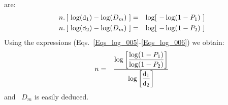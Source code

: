 are:\vspace{-0.1in}
\begin{eqnarray}
  \displaystyle n . \left[~ \log(\mbox{\small d}_1)-\log(D_m)~\right] &=& \log[~-\log(1-P_1)~] \label{Eqs_log_005} \\
  \displaystyle n . \left[~ \log(\mbox{\small d}_2)-\log(D_m)~\right] &=& \log[~-\log(1-P_2)~] \label{Eqs_log_006}
\end{eqnarray}\vspace{-0.1in}
Using the expressions (Eqs.~\ref{Eqs_log_005}-\ref{Eqs_log_006}) we obtain:\vspace{-0.1in}
\begin{eqnarray}
n &=& \frac{\log \left[\displaystyle\frac{ \log(1-P_1)}{\log(1-P_2)}\right]}{\displaystyle\log\left[\frac{\mbox{\small d}_1}{\mbox{\small d}_2} \right]} 
\end{eqnarray}
and~ $D_m$ is easily deduced.

